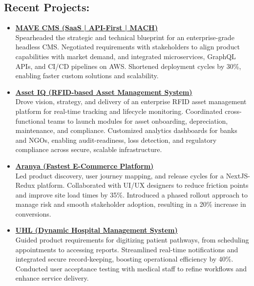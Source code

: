\documentclass[a4paper,10pt]{article}
\begin{document}
\subsection*{Recent Projects:}
\begin{itemize}[leftmargin=*]
    \item \textbf{\href{https://mave.ethertech.ltd}{MAVE CMS (SaaS | API-First | MACH)}} \\
    Spearheaded the strategic and technical blueprint for an enterprise-grade headless CMS. Negotiated requirements with stakeholders to align product capabilities with market demand, and integrated microservices, GraphQL APIs, and CI/CD pipelines on AWS. Shortened deployment cycles by 30\%, enabling faster custom solutions and scalability.

\item \textbf{\href{https://assetiq.ethertech.ltd/}{Asset IQ (RFID-based Asset Management System)}} \\
Drove vision, strategy, and delivery of an enterprise RFID asset management platform for real-time tracking and lifecycle monitoring. Coordinated cross-functional teams to launch modules for asset onboarding, depreciation, maintenance, and compliance. Customized analytics dashboards for banks and NGOs, enabling audit-readiness, loss detection, and regulatory compliance across secure, scalable infrastructure.

    \item \textbf{\href{https://www.aranya.com.bd/}{Aranya (Fastest E-Commerce Platform)}} \\
    Led product discovery, user journey mapping, and release cycles for a NextJS-Redux platform. Collaborated with UI/UX designers to reduce friction points and improve site load times by 35\%. Introduced a phased rollout approach to manage risk and smooth stakeholder adoption, resulting in a 20\% increase in conversions.

    \item \textbf{\href{https://www.uhlbd.com/}{UHL (Dynamic Hospital Management System)}} \\
    Guided product requirements for digitizing patient pathways, from scheduling appointments to accessing reports. Streamlined real-time notifications and integrated secure record-keeping, boosting operational efficiency by 40\%. Conducted user acceptance testing with medical staff to refine workflows and enhance service delivery.

\end{itemize}
\end{document}
